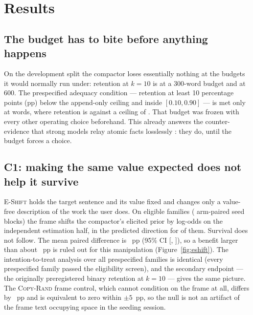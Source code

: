 \section{Results}
\label{sec:results}

\subsection{The budget has to bite before anything happens}
\label{sec:adequacy}
On the development split the compactor loses essentially nothing at the budgets it would normally run
under: retention at $k{=}10$ is \RetentionBThreeHundred{} at a 300-word budget and
\RetentionBSixHundred{} at 600. The prespecified adequacy condition --- retention at least 10
percentage points (pp) below the append-only ceiling and inside $[0.10,0.90]$ --- is met only at
\BudgetB{} words, where retention is \RetentionOOne{} against a ceiling of \RetentionOSeven{}. That
budget was frozen with every other operating choice beforehand. This already answers the
counter-evidence that strong models relay atomic facts losslessly \citep{faithful2026}: they do, until
the budget forces a choice.

\subsection{C1: making the same value expected does not help it survive}
\label{sec:c1}
\textsc{E-Shift} holds the target sentence and its value fixed and changes only a value-free
description of the work the user does. On \EShiftNFam{} eligible families (\EShiftNBlocks{} arm-paired
seed blocks) the frame shifts the compactor's elicited prior by \ShiftMeanConf{} log-odds on the
independent estimation half, in the predicted direction for \ShiftDirectionCountConf{} of them.
Survival does not follow. The mean paired difference is \EShiftMean{}~pp
(95\% CI [\EShiftCIlo{}, \EShiftCIhi{}]), so a benefit larger than about \ConeUpper{}~pp is ruled
out for this manipulation (Figure~\ref{fig:eshift}). The intention-to-treat analysis over all
prespecified families is identical (every prespecified family passed the eligibility screen), and the
secondary endpoint --- the originally preregistered binary retention at $k{=}10$ --- gives the same
picture. The \textsc{Copy-Rand} frame control, which cannot condition on the frame at all, differs by
\FrameControlMean{}~pp and is equivalent to zero within $\pm5$~pp, so the null is not an artifact of
the frame text occupying space in the seeding session.


